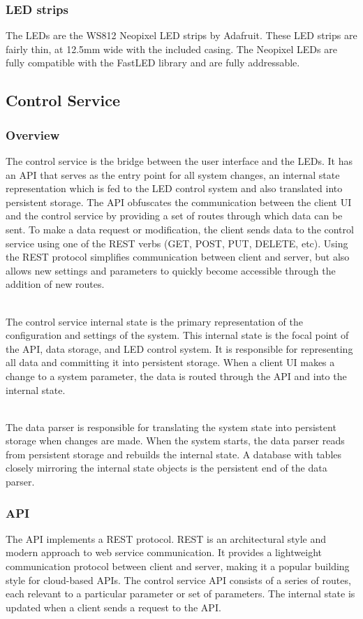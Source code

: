 \documentclass[onecolumn, draftclsnofoot,10pt, compsoc]{IEEEtran}
\begin{document}
			\subsubsection{LED strips}
			\noindent The LEDs are the WS812 Neopixel LED strips by Adafruit. These LED
			strips are fairly thin, at 12.5mm wide with the included casing. The
			Neopixel LEDs are fully compatible with the FastLED library and are fully addressable.\cite{neo}

		\subsection{Control Service}
			\subsubsection{Overview}
			The control service is the bridge between the user interface and the LEDs.
			It has an API that serves as the entry point for all system changes, an internal state representation which is fed to the LED control system and also translated into persistent storage.
			The API obfuscates the communication between the client UI and the control service by providing a set of routes through which data can be sent.
			To make a data request or modification, the client sends data to the control service using one of the REST verbs (GET, POST, PUT, DELETE, etc).
			Using the REST protocol simplifies communication between client and server, but also allows new settings and parameters to quickly become accessible through the addition of new routes.

			\noindent \\The control service internal state is the primary representation of the configuration and settings of the system.
			This internal state is the focal point of the API, data storage, and LED control system.
			It is responsible for representing all data and committing it into persistent storage.
			When a client UI makes a change to a system parameter, the data is routed through the API and into the internal state.

			\noindent \\The data parser is responsible for translating the system state into persistent storage when changes are made.
			When the system starts, the data parser reads from persistent storage and rebuilds the internal state.
			A database with tables closely mirroring the internal state objects is the persistent end of the data parser.

			\subsubsection{API}
			The API implements a REST protocol. REST is an architectural style and modern approach to web service communication. \cite{rest1}
			It provides a lightweight communication protocol between client and server, making it a popular building style for cloud-based APIs.
			The control service API consists of a series of routes, each relevant to a particular parameter or set of parameters.
			The internal state is updated when a client sends a request to the API.
\end{document}
